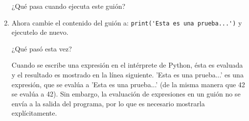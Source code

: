 \begin{enumerate}
¿Qué pasa cuando ejecuta este guión?
\item Ahora cambie el contenido del guión a: \verb+print('Esta es una prueba...')+
y ejecutelo de nuevo.

¿Qué pasó esta vez?

Cuando se escribe una expresión en el intérprete de Python, ésta es
evaluada y el resultado es mostrado en la línea siguiente. 'Esta es
una prueba...' es una expresión, que se evalúa a 'Esta es una prueba...'
(de la misma manera que 42 se evalúa a 42). Sin embargo, la evaluación
de expresiones en un guión no se envía a la salida del programa, por
lo que es necesario mostrarla explícitamente. 
\end{enumerate}

